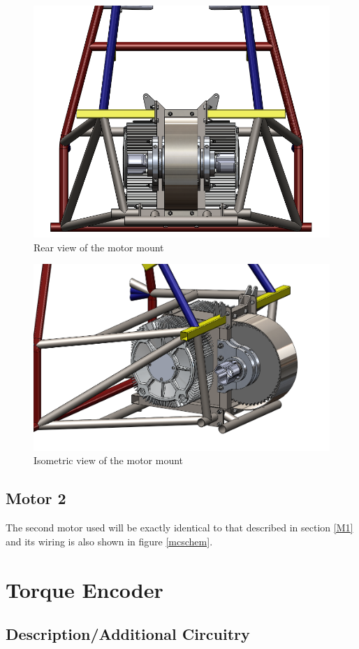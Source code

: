 \documentclass{article}
\begin{document}
            \begin{figure}[H]
                \centering
                \includegraphics[width = 0.6 \textwidth]{motormount_rearview}
                \caption{Rear view of the motor mount}
                \label{motormountrear}
            \end{figure}

            \begin{figure}[H]
                \centering
                \includegraphics[width = 0.6 \textwidth]{motormount_isoview}
                \caption{Isometric view of the motor mount}
                \label{motormountiso}
            \end{figure}

    \subsection{Motor 2} \label{M2}

        The second motor used will be exactly identical to that described in section \ref{M1} and its wiring is also shown in figure \ref{mcschem}.

\newpage

\section{Torque Encoder} \label{TorqueEncoder}

    \subsection{Description/Additional Circuitry}
\end{document}
